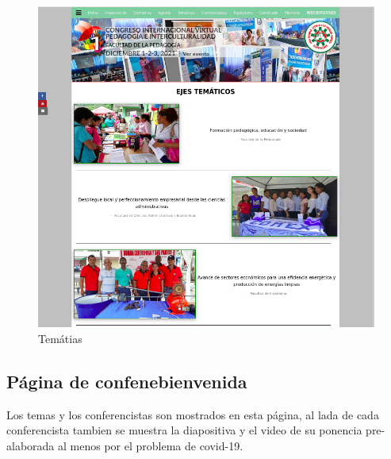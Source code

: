 \documentclass[a4paper,14px]{article}
\begin{document}
\begin{figure}[H]
  \centering
  \includegraphics[scale=0.6]{tematicas.png}
  \caption{Temátias}
  \label{fig:arquitectura}
\end{figure}


\newpage
\subsection{Página de confenebienvenida }
\label{sec:pagina-principal}

Los temas y los conferencistas son mostrados en esta página, al lada de cada conferencista tambien se muestra la diapositiva y el video de su ponencia pre-alaborada al menos por el problema de covid-19.
\end{document}
